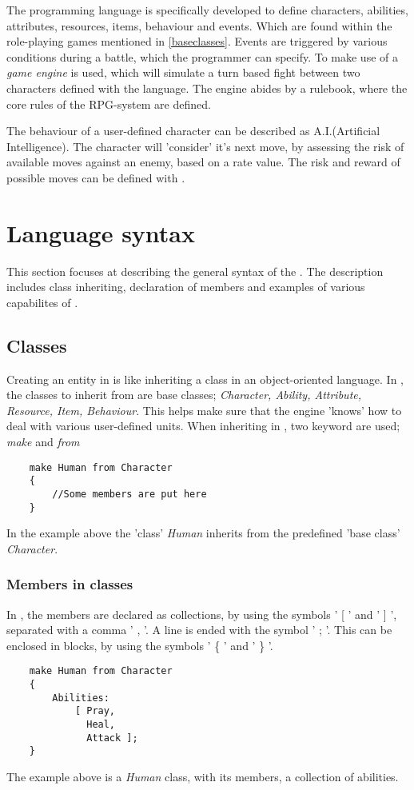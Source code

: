 The programming language \langname{} is specifically developed to define characters, abilities, attributes, resources, items, behaviour and events. Which are found within the role-playing games mentioned in \vref{baseclasses}. Events are triggered by various conditions during a battle, which the programmer can specify.
To make use of \langname{} a \emph{game engine} is used, which will simulate a turn based fight between two characters defined with the language. The engine abides by a rulebook, where the core rules of the RPG-system are defined. 

The behaviour of a user-defined character can be described as A.I.(Artificial Intelligence). The character will 'consider' it's next move, by assessing the risk of available moves against an enemy, based on a rate value. The risk and reward of possible moves can be defined with \langname{}.

\section{Language syntax}
This section focuses at describing the general syntax of the \langname{}. The description includes class inheriting, declaration of members and examples of various capabilites of \langname{}.

\subsection{Classes}
Creating an entity in \langname{} is like inheriting a class in an object-oriented language.
In \langname{}, the classes to inherit from are base classes; \emph{Character, Ability, Attribute, Resource, Item, Behaviour}. This helps make sure that the engine 'knows' how to deal with various user-defined units.
When inheriting in \langname{}, two keyword are used; \emph{make} and \emph{from}
\begin{lstlisting}
	make Human from Character
	{
		//Some members are put here
	}
\end{lstlisting}
In the example above the 'class' \emph{Human} inherits from the predefined 'base class' \emph{Character}.

\subsubsection*{Members in classes}
In \langname{}, the members are declared as collections, by using the symbols ' [ ' and ' ] ', separated with a comma ' , '.
A line is ended with the symbol ' ; '.
This can be enclosed in blocks, by using the symbols ' \{ ' and ' \} '.
\begin{lstlisting}
	make Human from Character
	{	
		Abilities:
			[ Pray, 
			  Heal,
			  Attack ];
	}
\end{lstlisting}
The example above is a \emph{Human} class, with its members, a collection of abilities.

